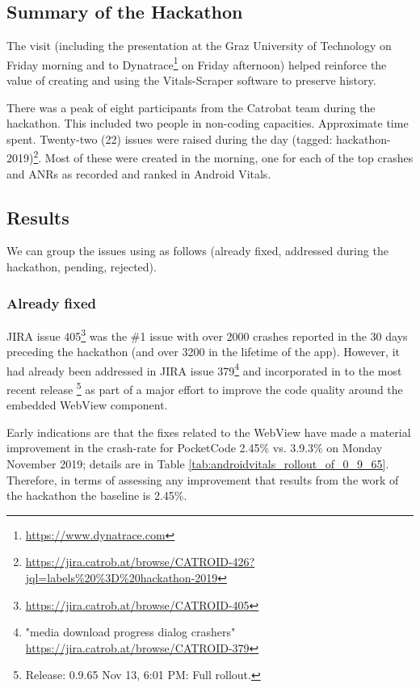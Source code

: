 \subsection{Summary of the Hackathon}
The visit (including the presentation at the Graz University of Technology on Friday morning and to Dynatrace\footnote{\url{https://www.dynatrace.com}} on Friday afternoon) helped reinforce the value of creating and using the Vitals-Scraper software to preserve history. 

There was a peak of eight participants from the Catrobat team during the hackathon. This included two people %
in non-coding capacities. Approximate time spent. Twenty-two (22) issues were raised during the day (tagged: hackathon-2019)\footnote{\url{https://jira.catrob.at/browse/CATROID-426?jql=labels\%20\%3D\%20hackathon-2019}}. Most of these were created in the morning, one for each of the top crashes and ANRs as recorded and ranked in Android Vitals. 

\subsection{Results}
We can group the issues using as follows (already fixed, addressed during the hackathon, pending, rejected).

\subsubsection{Already fixed} JIRA issue 405\footnote{\url{https://jira.catrob.at/browse/CATROID-405}} was the \#1 issue with over 2000 crashes reported in the 30 days preceding the hackathon (and over 3200 in the lifetime of the app). However, it had already been addressed in JIRA issue 379\footnote{"media download progress dialog crashers" \url{https://jira.catrob.at/browse/CATROID-379}} and incorporated in to the most recent release \footnote{Release:
0.9.65 Nov 13, 6:01 PM: Full rollout.} as part of a major effort to improve the code quality around the embedded WebView component.

Early indications are that the fixes related to the WebView have made a material improvement in the crash-rate for PocketCode 2.45\% vs. 3.9.3\% on Monday  November 2019; details are in Table \ref{tab:androidvitals_rollout_of_0_9_65}. Therefore, in terms of assessing any improvement that results from the work of the hackathon the baseline is 2.45\%.

